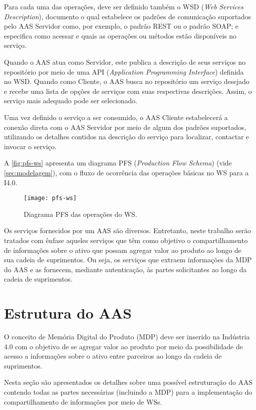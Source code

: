 	Para cada uma das operações, deve ser definido também o WSD (\textit{Web Services Description}), documento o qual estabelece os padrões de comunicação suportados pelo AAS Servidor como, por exemplo, o padrão REST ou o padrão SOAP; e especifica como acessar e quais as operações ou métodos estão disponíveis no serviço. 
	
	Quando o AAS atua como Servidor, este publica a descrição de seus serviços no repositório por meio de uma API (\textit{Application Programming Interface}) definida no WSD. Quando como Cliente, o AAS busca no repositório um serviço desejado e recebe uma lista de opções de serviços com suas respectivas descrições. Assim, o serviço mais adequado pode ser selecionado.
	
	Uma vez definido o serviço a ser consumido, o AAS Cliente estabelecerá a conexão direta com o AAS Servidor por meio de algum dos padrões suportados, utilizando os detalhes contidos na descrição do serviço para localizar, contactar e invocar o serviço.	
	
	A \autoref{fig:pfs-ws} apresenta um diagrama PFS (\textit{Production Flow Schema}) (vide \autoref{sec:modelagem}), com o fluxo de ocorrência das operações básicas no WS para a I4.0.
	
	\begin{figure}[htb]
		\centering
		\caption{Diagrama PFS das operações do WS.}
		\label{fig:pfs-ws}
		\texttt{[image: pfs-ws]}
	\end{figure}
	
	Os serviços fornecidos por um AAS são diversos. Entretanto, neste trabalho serão tratados com ênfase aqueles serviços que têm como objetivo o compartilhamento de informações sobre o ativo que possam agregar valor ao produto ao longo de sua cadeia de suprimentos. Ou seja, os serviços que extraem informações da MDP do AAS e as fornecem, mediante autenticação, às partes solicitantes ao longo da cadeia de suprimentos.

\section{Estrutura do AAS}

	O conceito de Memória Digital do Produto (MDP) deve ser inserido na Indústria 4.0 com o objetivo de se agregar valor ao produto por meio da possibilidade de acesso a informações sobre o ativo entre parceiros ao longo da cadeia de suprimentos.
	
	Nesta seção são apresentados os detalhes sobre uma possível estruturação do AAS contendo todas as partes necessárias (incluindo a MDP) para a implementação do compartilhamento de informações por meio de WSs.
	
